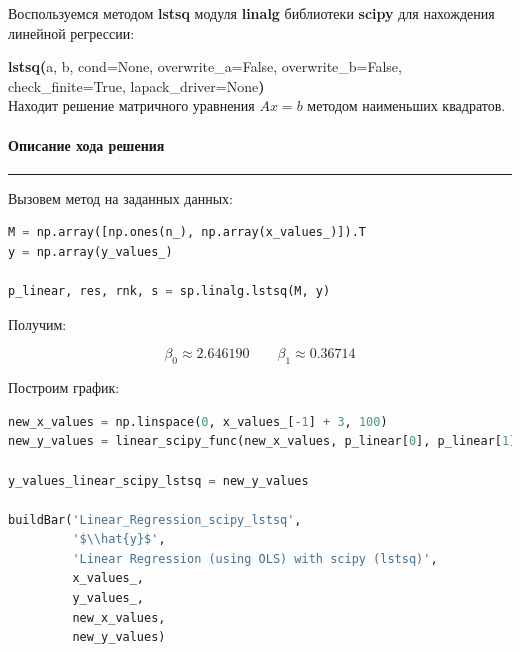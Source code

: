 \documentclass[a4paper, 14pt]{extarticle}
\begin{document}
Воспользуемся методом \textbf{lstsq} модуля \textbf{linalg} библиотеки \textbf{scipy} для 
нахождения линейной регрессии:

\begin{tcolorbox}[colback=mygray, boxrule=0pt, arc=0pt]
    \textbf{lstsq(}a, b, cond=None, overwrite\_a=False, overwrite\_b=False, check\_finite=True, 
    lapack\_driver=None\textbf{)} \\
    Находит решение матричного уравнения $Ax = b$ методом наименьших квадратов.
\end{tcolorbox}

\paragraph*{{Описание хода решения}}\vspace{-20pt}\rule{\linewidth}{0.1mm}

Вызовем метод на заданных данных:

\begin{center}
    \begin{lstlisting}[language=Python]
M = np.array([np.ones(n_), np.array(x_values_)]).T
y = np.array(y_values_)

p_linear, res, rnk, s = sp.linalg.lstsq(M, y)
    \end{lstlisting}
\end{center}

Получим:

\begin{equation*}
    \beta_0 \approx 2.646190 \qquad \beta_1 \approx 0.36714
\end{equation*}

Построим график:

\begin{center}
    \begin{lstlisting}[language=Python]
new_x_values = np.linspace(0, x_values_[-1] + 3, 100)
new_y_values = linear_scipy_func(new_x_values, p_linear[0], p_linear[1])

y_values_linear_scipy_lstsq = new_y_values

buildBar('Linear_Regression_scipy_lstsq', 
         '$\\hat{y}$', 
         'Linear Regression (using OLS) with scipy (lstsq)', 
         x_values_, 
         y_values_, 
         new_x_values, 
         new_y_values)
    \end{lstlisting}
\end{center}
\end{document}
